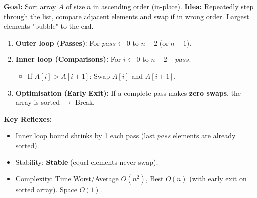 \documentclass[11pt]{article}
\begin{document}
\begin{methode}
    \textbf{Goal:} Sort array $A$ of size $n$ in ascending order (in-place).
    \textbf{Idea:} Repeatedly step through the list, compare adjacent elements and swap if in wrong order. Largest elements "bubble" to the end.
    \begin{enumerate}
        \item \textbf{Outer loop (Passes):} For $pass \leftarrow 0$ to $n-2$ (or $n-1$).
        \item \textbf{Inner loop (Comparisons):} For $i \leftarrow 0$ to $n-2-pass$.
            \begin{itemize}
                \item If $A[i] > A[i+1]$: Swap $A[i]$ and $A[i+1]$.
            \end{itemize}
        \item \textbf{Optimisation (Early Exit):} If a complete pass makes \textbf{zero swaps}, the array is sorted $\rightarrow$ Break.
    \end{enumerate}
    \textbf{Key Reflexes:}
    \begin{itemize}
        \item Inner loop bound shrinks by 1 each pass (last $pass$ elements are already sorted).
        \item Stability: \textbf{Stable} (equal elements never swap).
        \item Complexity: Time Worst/Average $O(n^2)$, Best $O(n)$ (with early exit on sorted array). Space $O(1)$.
    \end{itemize}
\end{methode}
\end{document}
